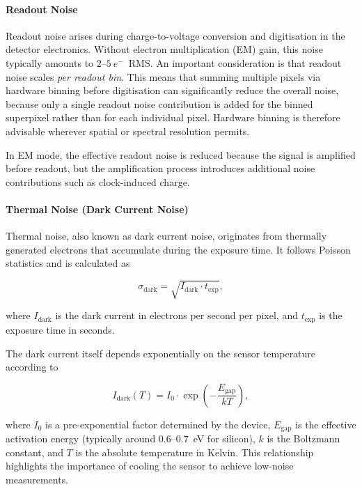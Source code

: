 \documentclass[
	parskip=half,
	a4paper,
]{scrarticle}
\begin{document}
\paragraph{Readout Noise}

Readout noise arises during charge-to-voltage conversion and digitisation in the detector electronics. Without electron multiplication (EM) gain, this noise typically amounts to $2$--$5~e^{-}$~RMS. An important consideration is that readout noise scales \emph{per readout bin}. This means that summing multiple pixels via hardware binning before digitisation can significantly reduce the overall noise, because only a single readout noise contribution is added for the binned superpixel rather than for each individual pixel. Hardware binning is therefore advisable wherever spatial or spectral resolution permits.

In EM mode, the effective readout noise is reduced because the signal is amplified before readout, but the amplification process introduces additional noise contributions such as clock-induced charge.

\paragraph{Thermal Noise (Dark Current Noise)}

Thermal noise, also known as dark current noise, originates from thermally generated electrons that accumulate during the exposure time. It follows Poisson statistics and is calculated as

\begin{equation}
    \sigma_{\text{dark}} = \sqrt{I_{\text{dark}} \cdot t_{\text{exp}}},
\end{equation}

where $I_{\text{dark}}$ is the dark current in electrons per second per pixel, and $t_{\text{exp}}$ is the exposure time in seconds.

The dark current itself depends exponentially on the sensor temperature according to

\begin{equation}
    I_{\text{dark}}(T) = I_0 \cdot \exp\left(-\frac{E_{\text{gap}}}{k T}\right),
\end{equation}

where $I_0$ is a pre-exponential factor determined by the device, $E_{\text{gap}}$ is the effective activation energy (typically around $0.6$--$0.7$~eV for silicon), $k$ is the Boltzmann constant, and $T$ is the absolute temperature in Kelvin. This relationship highlights the importance of cooling the sensor to achieve low-noise measurements.
\end{document}

